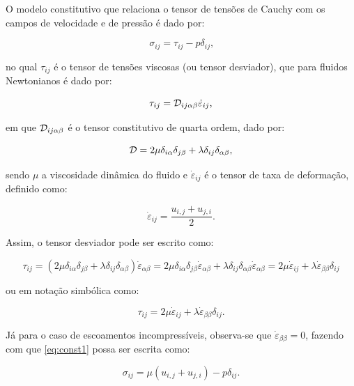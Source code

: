 \documentclass[_ArquivoPrincipal.tex]{subfiles}
\begin{document}
O modelo constitutivo que relaciona o tensor de tensões de Cauchy com os campos de velocidade e de pressão é dado por:

\begin{equation}
    \sigma_{ij}=\tau_{ij}-p\delta_{ij}\text{,}\label{eq:const1}
\end{equation}

\noindent no qual $\tau_{ij}$ é o tensor de tensões viscosas (ou tensor desviador), que para fluidos Newtonianos é dado por:

\begin{equation}
    \tau_{ij}=\mathcal{D}_{ij\alpha\beta}\dot{\varepsilon}_{ij}\text{,}
\end{equation}

\noindent em que $\mathcal{D}_{ij\alpha\beta}$ é o tensor constitutivo de quarta ordem, dado por:

\begin{equation}
    \mathcal{D}=2\mu\delta_{i\alpha}\delta_{j\beta}+\lambda\delta_{ij}\delta_{\alpha\beta}\text{,}
\end{equation}

\noindent sendo $\mu$ a viscosidade dinâmica do fluido e $\dot{\varepsilon}_{ij}$ é o tensor de taxa de deformação, definido como:

\begin{equation}
    \dot{\varepsilon}_{ij}=\frac{u_{i,j}+u_{j,i}}{2}\text{.}\label{eq:deftax1}
\end{equation}

Assim, o tensor desviador pode ser escrito como:

\[\tau_{ij}=(2\mu\delta_{i\alpha}\delta_{j\beta}+\lambda\delta_{ij}\delta_{\alpha\beta})\dot{\varepsilon}_{\alpha\beta}=2\mu\delta_{i\alpha}\delta_{j\beta}\dot{\varepsilon}_{\alpha\beta}+\lambda\delta_{ij}\delta_{\alpha\beta}\dot{\varepsilon}_{\alpha\beta}=2\mu\dot{\varepsilon}_{ij}+\lambda\dot{\varepsilon}_{\beta\beta}\delta_{ij}\]

\noindent ou em notação simbólica como:

\begin{equation}
    \tau_{ij}=2\mu\dot{\varepsilon}_{ij}+\lambda\dot{\varepsilon}_{\beta\beta}\delta_{ij}\text{.}
\end{equation}

Já para o caso de escoamentos incompressíveis, observa-se que $\dot{\varepsilon}_{\beta\beta}=0$, fazendo com que \ref{eq:const1} possa ser escrita como:

\begin{equation}
    \sigma_{ij}=\mu(u_{i,j}+u_{j,i})-p\delta_{ij}\text{.}\label{eq:ModConst}
\end{equation}
\end{document}
